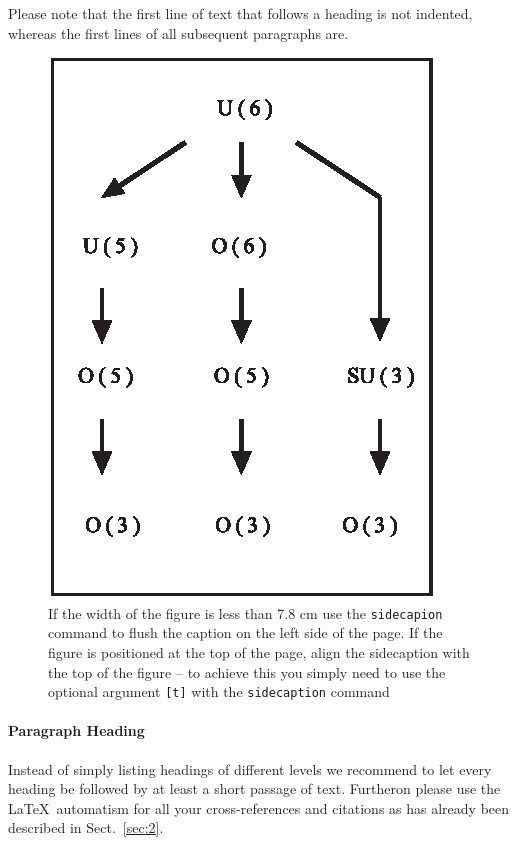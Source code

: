 \documentclass[graybox,envcountchap,sectrefs]{svmono}
\begin{document}
Please note that the first line of text that follows a heading is not indented, whereas the first lines of all subsequent paragraphs are.

%
\begin{figure}[b]
	\sidecaption
	\includegraphics[scale=.65]{img/figure}
	\caption{If the width of the figure is less than 7.8 cm use the \texttt{sidecapion} command to flush the caption on the left side of the page. If the figure is positioned at the top of the page, align the sidecaption with the top of the figure -- to achieve this you simply need to use the optional argument \texttt{[t]} with the \texttt{sidecaption} command}
	\label{fig:1}       %
\end{figure}


\paragraph{Paragraph Heading} %
Instead of simply listing headings of different levels we recommend to let every heading be followed by at least a short passage of text. Furtheron please use the \LaTeX\ automatism for all your cross-references and citations as has already been described in Sect.~\ref{sec:2}.
\end{document}
